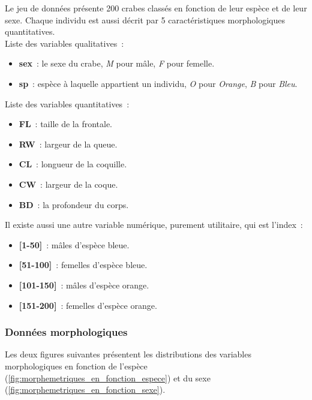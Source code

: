 \documentclass[a4paper,11pt]{report}
\begin{document}
Le jeu de données présente 200 crabes classés en fonction de leur espèce et de leur sexe. Chaque individu est aussi décrit par 5 caractéristiques morphologiques quantitatives.
\\
Liste des variables qualitatives~:
\begin{itemize}
	\item \textbf{sex}~: le sexe du crabe, \textit{M} pour mâle, \textit{F} pour femelle.
	\item \textbf{sp}~: espèce à laquelle appartient un individu, \textit{O} pour \textit{Orange}, \textit{B} pour \textit{Bleu}.
\end{itemize}
Liste des variables quantitatives~:
\begin{itemize}
	\item \textbf{FL}~: taille de la frontale.
	\item \textbf{RW}~: largeur de la queue.
	\item \textbf{CL}~: longueur de la coquille.
	\item \textbf{CW}~: largeur de la coque.
	\item \textbf{BD}~: la profondeur du corps.
\end{itemize}
Il existe aussi une autre variable numérique, purement utilitaire, qui est l'index~:
\begin{itemize}
	\item \textbf{[1-50]}~: mâles d'espèce bleue.
	\item \textbf{[51-100]}~: femelles d'espèce bleue.
	\item \textbf{[101-150]}~: mâles d'espèce orange.
	\item \textbf{[151-200]}~: femelles d'espèce orange.
\end{itemize}


\subsubsection{Données morphologiques}

Les deux figures suivantes présentent les distributions des variables morphologiques en fonction de l'espèce (\autoref{fig:morphemetriques_en_fonction_espece}) et du sexe (\autoref{fig:morphemetriques_en_fonction_sexe}).\\
\end{document}
